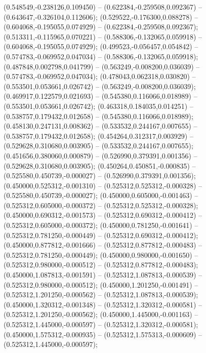  (0.548549,-0.238126,0.109450) -- (0.622384,-0.259508,0.092367) -- (0.643647,-0.326104,0.112606);
 (0.529522,-0.176300,0.088278) -- (0.604068,-0.195055,0.074929) -- (0.622384,-0.259508,0.092367);
 (0.513311,-0.115965,0.070221) -- (0.588306,-0.132065,0.059918) -- (0.604068,-0.195055,0.074929);
 (0.499523,-0.056457,0.054842) -- (0.574783,-0.069952,0.047034) -- (0.588306,-0.132065,0.059918);
 (0.487848,0.002798,0.041799) -- (0.563249,-0.008200,0.036039) -- (0.574783,-0.069952,0.047034);
 (0.478043,0.062318,0.030820) -- (0.553501,0.053661,0.026742) -- (0.563249,-0.008200,0.036039);
 (0.469917,0.122579,0.021693) -- (0.545380,0.116066,0.018989) -- (0.553501,0.053661,0.026742);
 (0.463318,0.184035,0.014251) -- (0.538757,0.179432,0.012658) -- (0.545380,0.116066,0.018989);
 (0.458130,0.247131,0.008362) -- (0.533532,0.244167,0.007655) -- (0.538757,0.179432,0.012658);
 (0.454264,0.312317,0.003929) -- (0.529628,0.310680,0.003905) -- (0.533532,0.244167,0.007655);
 (0.451656,0.380060,0.000879) -- (0.526990,0.379391,0.001356) -- (0.529628,0.310680,0.003905);
 (0.450264,0.450851,-0.000835) -- (0.525580,0.450739,-0.000027) -- (0.526990,0.379391,0.001356);
 (0.450000,0.525312,-0.001310) -- (0.525312,0.525312,-0.000328) -- (0.525580,0.450739,-0.000027);
 (0.450000,0.605000,-0.001463) -- (0.525312,0.605000,-0.000372) -- (0.525312,0.525312,-0.000328);
 (0.450000,0.690312,-0.001573) -- (0.525312,0.690312,-0.000412) -- (0.525312,0.605000,-0.000372);
 (0.450000,0.781250,-0.001641) -- (0.525312,0.781250,-0.000449) -- (0.525312,0.690312,-0.000412);
 (0.450000,0.877812,-0.001666) -- (0.525312,0.877812,-0.000483) -- (0.525312,0.781250,-0.000449);
 (0.450000,0.980000,-0.001650) -- (0.525312,0.980000,-0.000512) -- (0.525312,0.877812,-0.000483);
 (0.450000,1.087813,-0.001591) -- (0.525312,1.087813,-0.000539) -- (0.525312,0.980000,-0.000512);
 (0.450000,1.201250,-0.001491) -- (0.525312,1.201250,-0.000562) -- (0.525312,1.087813,-0.000539);
 (0.450000,1.320312,-0.001348) -- (0.525312,1.320312,-0.000581) -- (0.525312,1.201250,-0.000562);
 (0.450000,1.445000,-0.001163) -- (0.525312,1.445000,-0.000597) -- (0.525312,1.320312,-0.000581);
 (0.450000,1.575312,-0.000935) -- (0.525312,1.575313,-0.000609) -- (0.525312,1.445000,-0.000597);
